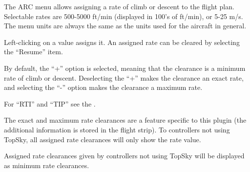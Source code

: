 \documentclass[11pt,a4paper]{memoir}
\newenvironment{Warn}
  {\begin{shaded}\marginnote{\fbox{Warning}}}
  {\end{shaded}}
\begin{document}
The ARC menu allows assigning a rate of climb or descent to the flight plan. Selectable rates are 500-5000 ft/min (displayed in 100’s of ft/min), or 5-25 m/s. The menu units are always the same as the units used for the aircraft in general.

Left-clicking on a value assigns it. An assigned rate can be cleared by selecting the “Resume” item.

By default, the “+” option is selected, meaning that the clearance is a minimum rate of climb or descent. Deselecting the “+” makes the clearance an exact rate, and selecting the “-” option makes the clearance a maximum rate.

For “RTI” and “TIP” see the \textit{}.

\begin{Warn}
The exact and maximum rate clearances are a feature specific to this plugin (the additional information is stored in the flight strip). To controllers not using TopSky, all assigned rate clearances will only show the rate value.

Assigned rate clearances given by controllers not using TopSky will be displayed as minimum rate clearances.      
\end{Warn}
\end{document}
